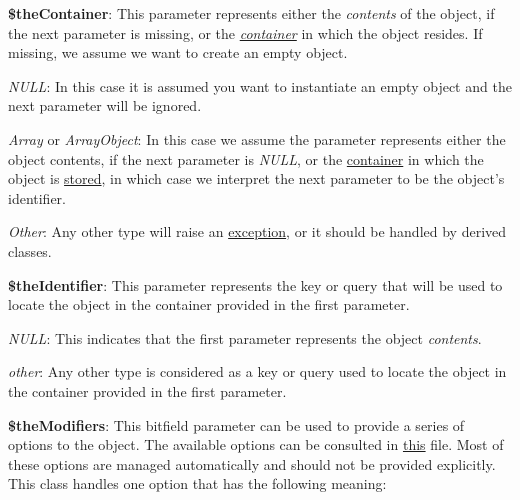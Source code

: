 \begin{DoxyItemize}
\item {\bfseries \$the\-Container}\-: This parameter represents either the {\itshape contents} of the object, if the next parameter is missing, or the {\itshape \hyperlink{class_c_container}{container}} in which the object resides. If missing, we assume we want to create an empty object. 
\begin{DoxyItemize}
\item {\itshape N\-U\-L\-L}\-: In this case it is assumed you want to instantiate an empty object and the next parameter will be ignored. 
\item {\itshape Array} or {\itshape Array\-Object}\-: In this case we assume the parameter represents either the object contents, if the next parameter is {\itshape N\-U\-L\-L}, or the \hyperlink{class_c_container}{container} in which the object is \hyperlink{class_c_persistent_object_a88b1f2b11d3d60e0b3d33d8b0649b68a}{stored}, in which case we interpret the next parameter to be the object's identifier. 
\item {\itshape Other}\-: Any other type will raise an \hyperlink{}{exception}, or it should be handled by derived classes. 
\end{DoxyItemize}
\item {\bfseries \$the\-Identifier}\-: This parameter represents the key or query that will be used to locate the object in the container provided in the first parameter. 
\begin{DoxyItemize}
\item {\itshape N\-U\-L\-L}\-: This indicates that the first parameter represents the object {\itshape contents}. 
\item {\itshape other}\-: Any other type is considered as a key or query used to locate the object in the container provided in the first parameter. 
\end{DoxyItemize}
\item {\bfseries \$the\-Modifiers}\-: This bitfield parameter can be used to provide a series of options to the object. The available options can be consulted in \hyperlink{}{this} file. Most of these options are managed automatically and should not be provided explicitly. This class handles one option that has the following meaning\-: 
\begin{DoxyItemize}

\end{DoxyItemize}
\end{DoxyItemize}
